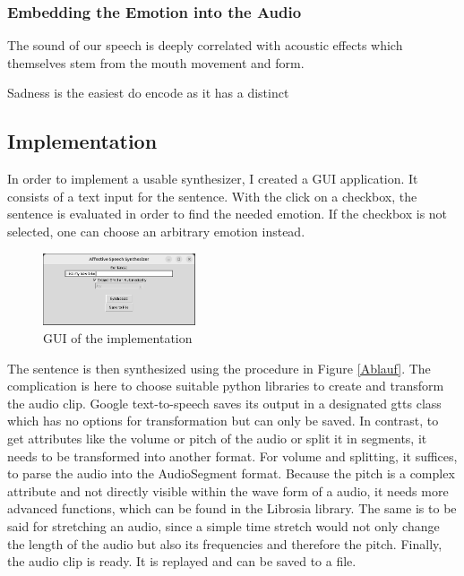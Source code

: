 \documentclass[11pt]{article}
\begin{document}
\subsubsection{Embedding the Emotion into the Audio}

The sound of our speech is deeply correlated with acoustic effects which themselves stem from the mouth movement and form\cite{arias_beyond_2020}. 



Sadness is the easiest do encode as it has a distinct


\subsection{Implementation}

In order to implement a usable synthesizer, I created a GUI application. It consists of a text input for the sentence. With the click on a checkbox, the sentence is evaluated in order to find the needed emotion. If the checkbox is not selected, one can choose an arbitrary emotion instead. 

\begin{figure}[h]
 \centering
\includegraphics[width=0.4\textwidth]{"Bilder/GUI.png"}
\caption{GUI of the implementation}
\end{figure}

The sentence is then synthesized using the procedure in Figure \ref{Ablauf}. The complication is here to choose suitable python libraries to create and transform the audio clip. Google text-to-speech saves its output in a designated gtts class which has no options for transformation but can only be saved. In contrast, to get attributes like the volume or pitch of the audio or split it in segments, it needs to be transformed into another format. For volume and splitting, it suffices, to parse the audio into the AudioSegment format. Because the pitch is a complex attribute and not directly visible within the wave form of a audio, it needs more advanced functions, which can be found in the Librosia library. The same is to be said for stretching an audio, since a simple time stretch would not only change the length of the audio but also its frequencies and therefore the pitch.
Finally, the audio clip is ready. It is replayed and can be saved to a file.
\end{document}
